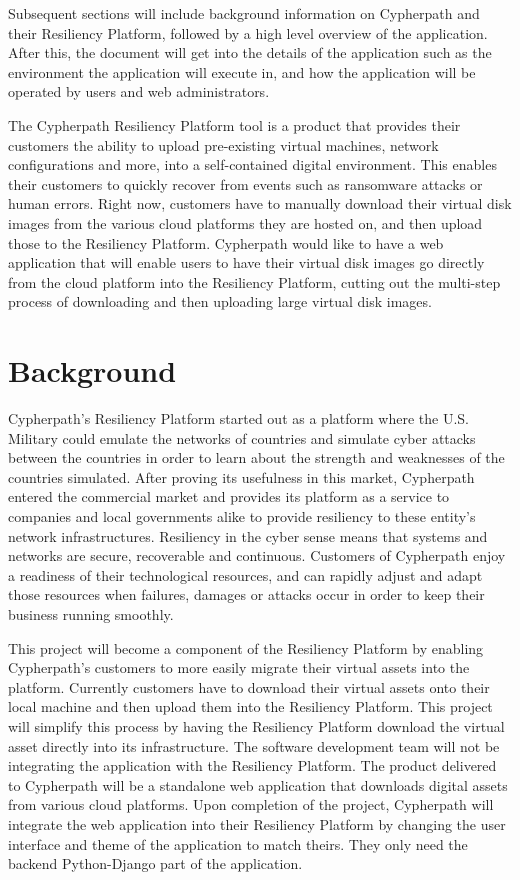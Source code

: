 \documentclass{article}
\begin{document}
    Subsequent sections will include background information on Cypherpath and their Resiliency Platform, followed by a high level overview of the application. After this, the document will get into the
    details of the application such as the environment the application will execute in, and how the application will be operated by users and web administrators.

	  The Cypherpath Resiliency Platform tool is a product that provides their customers the ability to upload pre-existing virtual machines, network configurations and more, into 
    a self-contained digital environment. This enables their customers to quickly recover from events such as ransomware attacks or human errors. Right now, customers have to manually download their virtual disk images from
    the various cloud platforms they are hosted on, and then upload those to the Resiliency Platform. Cypherpath would like to have a web application that will enable users to have their virtual disk images go
    directly from the cloud platform into the Resiliency Platform, cutting out the multi-step process of downloading and then uploading large virtual disk images.
	
    \section{Background}
    Cypherpath's Resiliency Platform started out as a platform where the U.S. Military could emulate the networks of countries and simulate cyber attacks between the countries in order to
    learn about the strength and weaknesses of the countries simulated. After proving its usefulness in this market, Cypherpath entered the commercial market and provides its platform as a service to
    companies and local governments alike to provide resiliency to these entity's network infrastructures. Resiliency in the cyber sense means that systems and networks are secure, recoverable and
    continuous. Customers of Cypherpath enjoy a readiness of their technological resources, and can rapidly adjust and adapt those resources when failures, damages or attacks occur in order to keep their business running smoothly.

    This project will become a component of the Resiliency Platform by enabling Cypherpath's customers to more easily migrate their virtual assets into the platform. Currently customers have to download
    their virtual assets onto their local machine and then upload them into the Resiliency Platform. This project will simplify this process by having the Resiliency Platform download the virtual asset directly
    into its infrastructure. The software development team will not be integrating the application with the Resiliency Platform. The product delivered to Cypherpath will be a standalone web application that downloads
    digital assets from various cloud platforms. Upon completion of the project, Cypherpath will integrate the web application into their Resiliency Platform by changing the user interface and theme of the application to match
    theirs. They only need the backend Python-Django part of the application.
\end{document}
